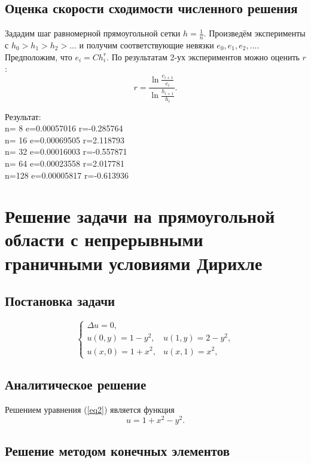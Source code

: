 \documentclass{report}
\begin{document}
\section{Оценка скорости сходимости численного решения}
Зададим шаг равномерной прямоугольной сетки $h=\frac{1}{n}$. Произведём эксперименты с $h_0>h_1>h_2>...$ и получим соответствующие невязки $e_0, e_1, e_2, ...$. Предположим, что $e_i=Ch_i^r$. По результатам 2-ух экспериментов можно оценить $r$:
\begin{equation}
	r = \frac{\ln{\frac{e_{i+1}}{e_i}}}{\ln{\frac{h_{i+1}}{h_i}}}.
\end{equation}
\begin{center}
	Результат:\\
	n=  8 e=0.00057016 r=-0.285764\\
	n= 16 e=0.00069505 r=2.118793\\
	n= 32 e=0.00016003 r=-0.557871\\
	n= 64 e=0.00023558 r=2.017781\\
	n=128 e=0.00005817 r=-0.613936\\
\end{center}

\chapter{Решение задачи на прямоугольной области с непрерывными граничными условиями Дирихле}
\section{Постановка задачи}
\begin{equation}\label{eq2}
	\begin{cases}
		\Delta u = 0, \\
		u(0, y) = 1-y^2,&u(1, y)=2-y^2,\\
		u(x, 0) = 1+x^2,&u(x, 1)=x^2,
	\end{cases}
\end{equation}

\section{Аналитическое решение}
Решением уравнения (\ref{eq2}) является функция
\begin{equation}
	u=1+x^2-y^2.
\end{equation}

\section{Решение методом конечных элементов}
\end{document}
